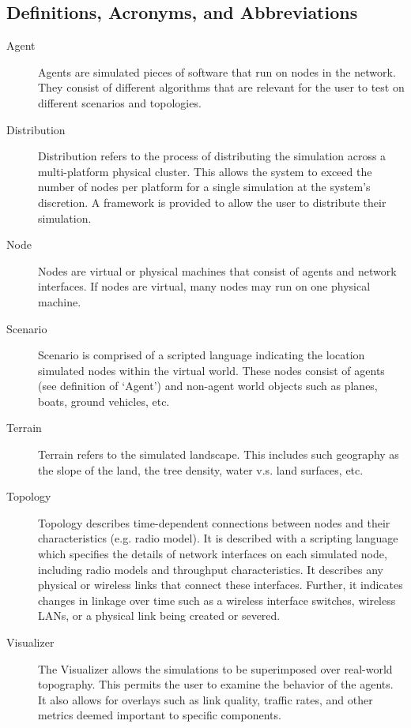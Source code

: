 \documentclass[titlepage]{article}
\begin{document}
\subsection{Definitions, Acronyms, and Abbreviations}
\begin{description}
\item[Agent]
	Agents are simulated pieces of software that run on nodes in the network. They consist of different algorithms that are relevant for the user to test on different scenarios and topologies.   

\item[Distribution]
	Distribution refers to the process of distributing the simulation across a multi-platform physical cluster.  This allows the system to exceed the number of nodes per platform for a single simulation at the system's discretion.  A framework is provided to allow the user to distribute their simulation. 	

\item[Node]
	Nodes are virtual or physical machines that consist of agents and network interfaces.  If nodes are virtual, many nodes may run on one physical machine.  

\item[Scenario]
	Scenario is comprised of a scripted language indicating the location simulated nodes within the virtual world. These nodes consist of agents (see definition of `Agent') and non-agent world objects such as planes, boats, ground vehicles, etc. 

\item[Terrain]
	Terrain refers to the simulated landscape.  This includes such geography as the slope of the land, the tree density, water v.s. land surfaces, etc.

\item[Topology]
	Topology describes time-dependent connections between nodes and their characteristics (e.g. radio model). It is described with a scripting language which specifies the details of network interfaces on each simulated node, including radio models and throughput characteristics.  It describes any physical or wireless links that connect these interfaces.  Further, it indicates changes in linkage over time such as a wireless interface switches, wireless LANs, or a physical link being created or severed. 

\item[Visualizer]
	The Visualizer allows the simulations to be superimposed over real-world topography.  This permits the user to examine the behavior of the agents.  It also allows for overlays such as link quality, traffic rates, and other metrics deemed important to specific components.
\end{description}
\end{document}
